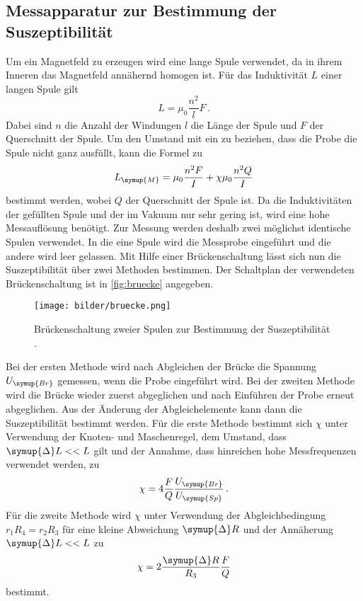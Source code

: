 \subsection{Messapparatur zur Bestimmung der Suszeptibilität}
\label{sec:Messapparatur}
Um ein Magnetfeld zu erzeugen wird eine lange Spule verwendet, da in ihrem Inneren das Magnetfeld annähernd homogen
ist. Für das Induktivität $L$ einer langen Spule gilt
\begin{equation*}
    L = \mu_{0}\frac{n^2}{l}F\,.
\end{equation*}
Dabei sind $n$ die Anzahl der Windungen $l$ die Länge der Spule und $F$ der Querschnitt der Spule. Um den Umstand
mit ein zu beziehen, dass die Probe die Spule nicht ganz ausfüllt, kann die Formel zu
\begin{equation}
    L_{\symup{M}} = \mu_{0}\frac{n^{2}F}{I}+\chi\mu_{0}\frac{n^{2}Q}{I}
\end{equation}
bestimmt werden, wobei $Q$ der Querschnitt der Spule ist. Da die Induktivitäten der gefüllten Spule und der im
Vakuum nur sehr gering ist, wird eine hohe Messauflösung benötigt. Zur Messung werden deshalb zwei
möglichst identische Spulen verwendet. In die eine Spule wird die Messprobe eingeführt und die andere wird leer
gelassen. Mit Hilfe einer Brückenschaltung lässt sich nun die Suszeptibilität über zwei Methoden bestimmen.
Der Schaltplan der verwendeten Brückenschaltung ist in \autoref{fig:bruecke} angegeben.
\begin{figure}
    \centering
    \texttt{[image: bilder/bruecke.png]}
    \caption{Brückenschaltung zweier Spulen zur Bestimmung der Suszeptibilität \cite{sample}.}
    \label{fig:bruecke}
\end{figure}
Bei der ersten Methode wird nach Abgleichen der Brücke die Spannung $U_{\symup{Br}}$ gemessen, wenn die Probe
eingeführt wird. Bei der zweiten Methode wird die Brücke wieder zuerst abgeglichen und nach Einführen der Probe
erneut abgeglichen. Aus der Änderung der Abgleichelemente kann dann die Suszeptibilität bestimmt werden.
Für die erste Methode bestimmt sich $\chi$ unter Verwendung der Knoten- und Maschenregel, dem Umstand,
dass $\symup{\Delta}L << L$ gilt und der Annahme, dass hinreichen hohe Messfrequenzen verwendet werden, zu
\begin{equation}
    \label{eqn:chiSp}
    \chi = 4\frac{F}{Q}\frac{U_{\symup{Br}}}{U_{\symup{Sp}}}\,.
\end{equation}
Für die zweite Methode wird $\chi$ unter Verwendung der Abgleichbedingung $r_{1}R_{4}=r_{2}R_{3}$ für eine kleine
Abweichung $\symup{\Delta}R$ und der Annäherung $\symup{\Delta}L << L$ zu
\begin{equation}
    \label{eqn:chiWd}
    \chi = 2 \frac{\symup{\Delta}R}{R_{3}}\frac{F}{Q}
\end{equation}
bestimmt.

